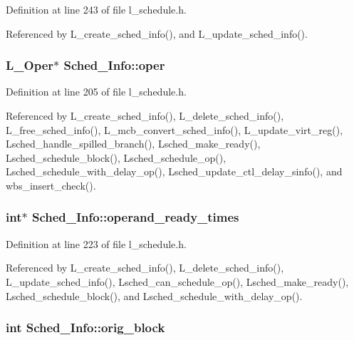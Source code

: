 Definition at line 243 of file l\_\-schedule.h.

Referenced by L\_\-create\_\-sched\_\-info(), and L\_\-update\_\-sched\_\-info().
\subsubsection{\setlength{\rightskip}{0pt plus 5cm}L\_\-Oper$\ast$ \bf{Sched\_\-Info::oper}}\label{structSched__Info_a90db55284bb8cab72794a2cc7628644}




Definition at line 205 of file l\_\-schedule.h.

Referenced by L\_\-create\_\-sched\_\-info(), L\_\-delete\_\-sched\_\-info(), L\_\-free\_\-sched\_\-info(), L\_\-mcb\_\-convert\_\-sched\_\-info(), L\_\-update\_\-virt\_\-reg(), Lsched\_\-handle\_\-spilled\_\-branch(), Lsched\_\-make\_\-ready(), Lsched\_\-schedule\_\-block(), Lsched\_\-schedule\_\-op(), Lsched\_\-schedule\_\-with\_\-delay\_\-op(), Lsched\_\-update\_\-ctl\_\-delay\_\-sinfo(), and wbs\_\-insert\_\-check().
\subsubsection{\setlength{\rightskip}{0pt plus 5cm}int$\ast$ \bf{Sched\_\-Info::operand\_\-ready\_\-times}}\label{structSched__Info_64c3aeff8171670ce68fde9d3644bcf1}




Definition at line 223 of file l\_\-schedule.h.

Referenced by L\_\-create\_\-sched\_\-info(), L\_\-delete\_\-sched\_\-info(), L\_\-update\_\-sched\_\-info(), Lsched\_\-can\_\-schedule\_\-op(), Lsched\_\-make\_\-ready(), Lsched\_\-schedule\_\-block(), and Lsched\_\-schedule\_\-with\_\-delay\_\-op().
\subsubsection{\setlength{\rightskip}{0pt plus 5cm}int \bf{Sched\_\-Info::orig\_\-block}}\label{structSched__Info_5dc48577b12198f60db35220ba3adba1}




